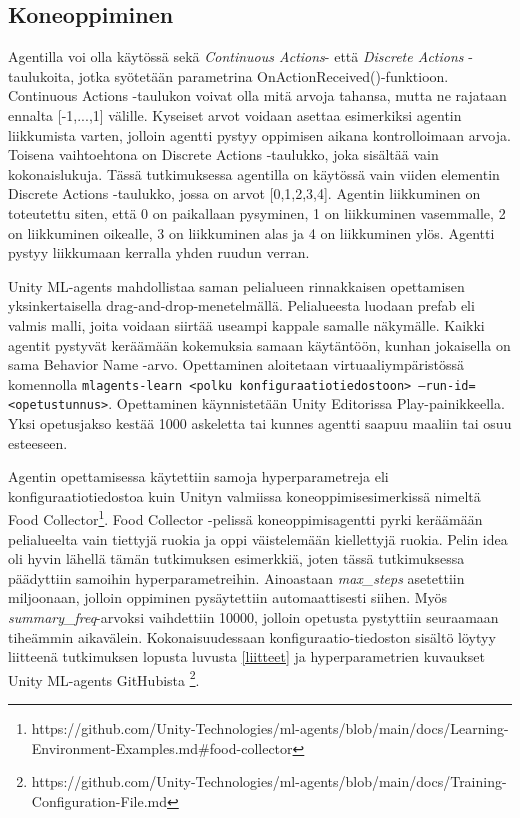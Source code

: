 \documentclass[utf8]{gradu3}
\begin{document}
\subsection{Koneoppiminen}
\label{koneoppiminenasetelma}

Agentilla voi olla käytössä sekä \textit{Continuous Actions}- että \textit{Discrete Actions} -taulukoita, jotka syötetään parametrina OnActionReceived()-funktioon. Continuous Actions -taulukon voivat olla mitä arvoja tahansa, mutta ne rajataan ennalta [-1,...,1] välille. Kyseiset arvot voidaan asettaa esimerkiksi agentin liikkumista varten, jolloin agentti pystyy oppimisen aikana kontrolloimaan arvoja. Toisena vaihtoehtona on Discrete Actions -taulukko, joka sisältää vain kokonaislukuja. Tässä tutkimuksessa agentilla on käytössä vain viiden elementin Discrete Actions -taulukko, jossa on arvot [0,1,2,3,4]. Agentin liikkuminen on toteutettu siten, että 0 on paikallaan pysyminen, 1 on liikkuminen vasemmalle, 2 on liikkuminen oikealle, 3 on liikkuminen alas ja 4 on liikkuminen ylös. Agentti pystyy liikkumaan kerralla yhden ruudun verran.

Unity ML-agents mahdollistaa saman pelialueen rinnakkaisen opettamisen yksinkertaisella drag-and-drop-menetelmällä. Pelialueesta luodaan prefab eli valmis malli, joita voidaan siirtää useampi kappale samalle näkymälle. Kaikki agentit pystyvät keräämään kokemuksia samaan käytäntöön, kunhan jokaisella on sama Behavior Name -arvo. Opettaminen aloitetaan virtuaaliympäristössä komennolla \texttt{mlagents-learn <polku kon\-fi\-gu\-raa\-ti\-o\-tie\-dos\-toon> --run-id=<opetustunnus>}. Opettaminen käynnistetään Unity Editorissa Play-painikkeella. Yksi opetusjakso kestää 1000 askeletta tai kunnes agentti saapuu maaliin tai osuu esteeseen.

Agentin opettamisessa käytettiin samoja hyperparametreja eli konfiguraatiotiedostoa kuin Unityn valmiissa koneoppimisesimerkissä nimeltä Food Collector\footnote{https://github.com/Unity-Technologies/ml-agents/blob/main/docs/Learning-Environment-Examples.md\#food-collector}. Food Collector -pelissä koneoppimisagentti pyrki keräämään pelialueelta vain tiettyjä ruokia ja oppi väistelemään kiellettyjä ruokia. Pelin idea oli hyvin lähellä tämän tutkimuksen esimerkkiä, joten tässä tutkimuksessa päädyttiin samoihin hyperparametreihin. Ainoastaan \textit{max\_steps} asetettiin miljoonaan, jolloin oppiminen pysäytettiin automaattisesti siihen. Myös \textit{summary\_freq}-arvoksi vaihdettiin 10000, jolloin opetusta pystyttiin seuraamaan tiheämmin aikavälein. Kokonaisuudessaan konfiguraatio-tiedoston sisältö löytyy liitteenä tutkimuksen lopusta luvusta \ref{liitteet} ja hyperparametrien kuvaukset Unity ML-agents GitHubista \footnote{https://github.com/Unity-Technologies/ml-agents/blob/main/docs/Training-Configuration-File.md}.
\end{document}
